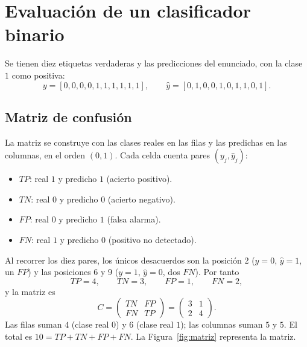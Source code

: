 \documentclass[12pt,a4paper]{article}
\begin{document}
\section{Evaluación de un clasificador binario}

Se tienen diez etiquetas verdaderas y las predicciones del enunciado, con la
clase $1$ como positiva:
\begin{equation}
  y=[0,0,0,0,1,1,1,1,1,1],
  \qquad
  \hat{y}=[0,1,0,0,1,0,1,1,0,1].
\end{equation}

\subsection{Matriz de confusión}

La matriz se construye con las clases reales en las filas y las predichas en
las columnas, en el orden $(0,1)$. Cada celda cuenta pares $(y_j,\hat{y}_j)$:
\begin{itemize}[leftmargin=1.4em,itemsep=0.15em]
  \item $TP$: real $1$ y predicho $1$ (acierto positivo).
  \item $TN$: real $0$ y predicho $0$ (acierto negativo).
  \item $FP$: real $0$ y predicho $1$ (falsa alarma).
  \item $FN$: real $1$ y predicho $0$ (positivo no detectado).
\end{itemize}

Al recorrer los diez pares, los únicos desacuerdos son la posición 2
($y=0$, $\hat{y}=1$, un $FP$) y las posiciones 6 y 9 ($y=1$, $\hat{y}=0$, dos
$FN$). Por tanto
\begin{equation}
  TP=4,\qquad TN=3,\qquad FP=1,\qquad FN=2,
\end{equation}
y la matriz es
\begin{equation}
  C=
  \begin{pmatrix}
    TN & FP\\
    FN & TP
  \end{pmatrix}
  =
  \begin{pmatrix}
    3 & 1\\
    2 & 4
  \end{pmatrix}.
  \label{eq:matriz}
\end{equation}
Las filas suman $4$ (clase real $0$) y $6$ (clase real $1$); las columnas suman
$5$ y $5$. El total es $10=TP+TN+FP+FN$. La Figura~\ref{fig:matriz} representa
la matriz.
\end{document}
